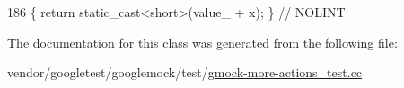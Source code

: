 \begin{DoxyCode}
186 \{ \textcolor{keywordflow}{return} \textcolor{keyword}{static\_cast<}\textcolor{keywordtype}{short}\textcolor{keyword}{>}(value\_ + x); \}  \textcolor{comment}{// NOLINT}
\end{DoxyCode}


The documentation for this class was generated from the following file\+:\begin{DoxyCompactItemize}
\item 
vendor/googletest/googlemock/test/\hyperlink{gmock-more-actions__test_8cc}{gmock-\/more-\/actions\+\_\+test.\+cc}\end{DoxyCompactItemize}
